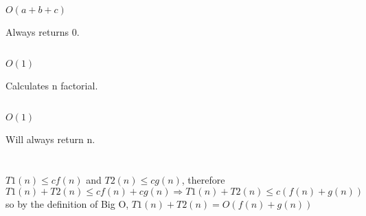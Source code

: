 \documentclass{article}
\begin{document}
    \section{}
        \subsection{}
        $O(a + b + c)$

        Always returns $0$.
        \subsection{}
        $O(1)$

        Calculates n factorial.
        \subsection{}
        $O(1)$

        Will always return n.
    \section{}
    $T1(n) \leq cf(n)$ and $T2(n) \leq cg(n)$, therefore $T1(n) + T2(n) \leq cf(n) + cg(n) \Rightarrow T1(n) + T2(n) \leq c(f(n) + g(n))$ so by the definition of Big O, $T1(n) + T2(n) = O(f(n) + g(n))$ 
\end{document}
